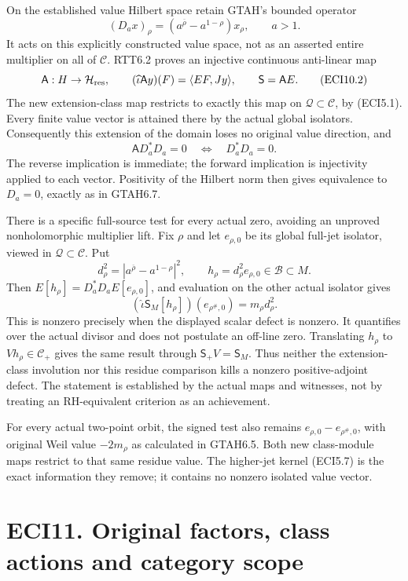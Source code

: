 On the established value Hilbert space retain GTAH's bounded operator \[
(D_ax)_\rho=(a^{\overline\rho}-a^{1-\rho})x_\rho,
\qquad a>1.
\tag{ECI10.1}
\] It acts on this explicitly constructed value space, not as an
asserted entire multiplier on all of \(\mathscr C\). RTT6.2 proves an
injective continuous anti-linear map \[
\mathsf A:H\to\mathcal H_{\rm res},\qquad
(\widehat\iota\mathsf Ay)(F)=\langle EF,Jy\rangle,
\qquad\mathsf S=\mathsf A E.
\tag{ECI10.2}
\] The new extension-class map restricts to exactly this map on
\(\mathcal Q\subset\mathscr C\), by (ECI5.1). Every finite value vector
is attained there by the actual global isolators. Consequently this
extension of the domain loses no original value direction, and \[
\mathsf A D_a^*D_a=0\quad\Longleftrightarrow\quad D_a^*D_a=0.
\tag{ECI10.3}
\] The reverse implication is immediate; the forward implication is
injectivity applied to each vector. Positivity of the Hilbert norm then
gives equivalence to \(D_a=0\), exactly as in GTAH6.7.

There is a specific full-source test for every actual zero, avoiding an
unproved nonholomorphic multiplier lift. Fix \(\rho\) and let
\(e_{\rho,0}\) be its global full-jet isolator, viewed in
\(\mathcal Q\subset\mathscr C\). Put \[
d_\rho^2=|a^{\overline\rho}-a^{1-\rho}|^2,
\qquad h_\rho=d_\rho^2 e_{\rho,0}\in\mathcal B\subset M.
\tag{ECI10.4}
\] Then \(E[h_\rho]=D_a^*D_a E[e_{\rho,0}]\), and evaluation on the
other actual isolator gives \[
(\widehat\iota\mathsf S_M[h_\rho])(e_{\rho^\#,0})
=m_\rho d_\rho^2.
\tag{ECI10.5}
\] This is nonzero precisely when the displayed scalar defect is
nonzero. It quantifies over the actual divisor and does not postulate an
off-line zero. Translating \(h_\rho\) to \(Vh_\rho\in\mathscr C_+\)
gives the same result through \(\mathsf S_+V=\mathsf S_M\). Thus neither
the extension-class involution nor this residue comparison kills a
nonzero positive-adjoint defect. The statement is established by the
actual maps and witnesses, not by treating an RH-equivalent criterion as
an achievement.

For every actual two-point orbit, the signed test also remains
\(e_{\rho,0}-e_{\rho^\#,0}\), with original Weil value \(-2m_\rho\) as
calculated in GTAH6.5. Both new class-module maps restrict to that same
residue value. The higher-jet kernel (ECI5.7) is the exact information
they remove; it contains no nonzero isolated value vector.

\section{ECI11. Original factors, class actions and category
scope}\label{eci11.-original-factors-class-actions-and-category-scope}

